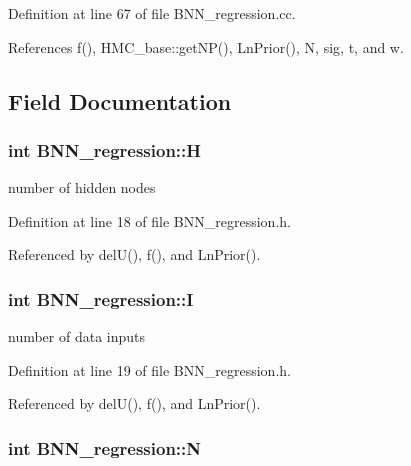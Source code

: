 Definition at line 67 of file B\-N\-N\-\_\-regression.\-cc.



References f(), H\-M\-C\-\_\-base\-::get\-N\-P(), Ln\-Prior(), N, sig, t, and w.



\subsection{Field Documentation}
\hypertarget{class_b_n_n__regression_a0f200c3e1f769b7f7287751dbb9a879d}{
\subsubsection[{H}]{\setlength{\rightskip}{0pt plus 5cm}int B\-N\-N\-\_\-regression\-::\-H\hspace{0.3cm}{\ttfamily [private]}}}\label{class_b_n_n__regression_a0f200c3e1f769b7f7287751dbb9a879d}


number of hidden nodes 



Definition at line 18 of file B\-N\-N\-\_\-regression.\-h.



Referenced by del\-U(), f(), and Ln\-Prior().

\hypertarget{class_b_n_n__regression_a134c65919bfa6fb8cb784c9398be3230}{
\subsubsection[{I}]{\setlength{\rightskip}{0pt plus 5cm}int B\-N\-N\-\_\-regression\-::\-I\hspace{0.3cm}{\ttfamily [private]}}}\label{class_b_n_n__regression_a134c65919bfa6fb8cb784c9398be3230}


number of data inputs 



Definition at line 19 of file B\-N\-N\-\_\-regression.\-h.



Referenced by del\-U(), f(), and Ln\-Prior().

\hypertarget{class_b_n_n__regression_af6ab772dcedde86e69cfd29cb3115387}{
\subsubsection[{N}]{\setlength{\rightskip}{0pt plus 5cm}int B\-N\-N\-\_\-regression\-::\-N\hspace{0.3cm}{\ttfamily [private]}}}\label{class_b_n_n__regression_af6ab772dcedde86e69cfd29cb3115387}


